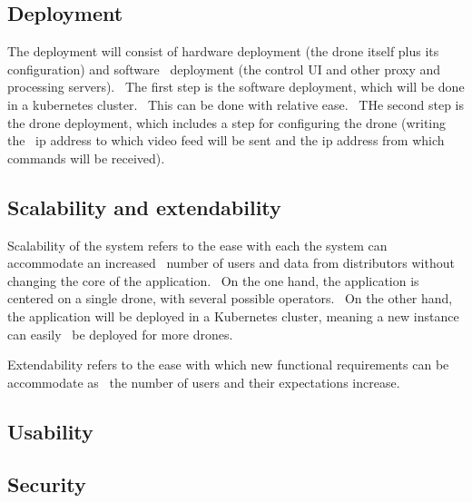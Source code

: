 \subsection{Deployment}
\label{subsec:deployment}
The deployment will consist of hardware deployment (the drone itself plus its configuration) and software \
deployment (the control UI and other proxy and processing servers). \
The first step is the software deployment, which will be done in a kubernetes cluster. \
This can be done with relative ease. \
THe second step is the drone deployment, which includes a step for configuring the drone (writing the \
ip address to which video feed will be sent and the ip address from which commands will be received).

\subsection{Scalability and extendability}
\label{subsec:specification-scalability}
Scalability of the system refers to the ease with each the system can accommodate an increased \
number of users and data from distributors without changing the core of the application. \
On the one hand, the  application is centered on a single drone, with several possible operators. \
On the other hand, the application will be deployed in a Kubernetes cluster, meaning a new instance can easily \
be deployed for more drones.

Extendability refers to the ease with which new functional requirements can be accommodate as \
the number of users and their expectations increase.  %

\subsection{Usability}
\label{subsec:specification-usability}

\subsection{Security}
\label{subsec:specification-security}
